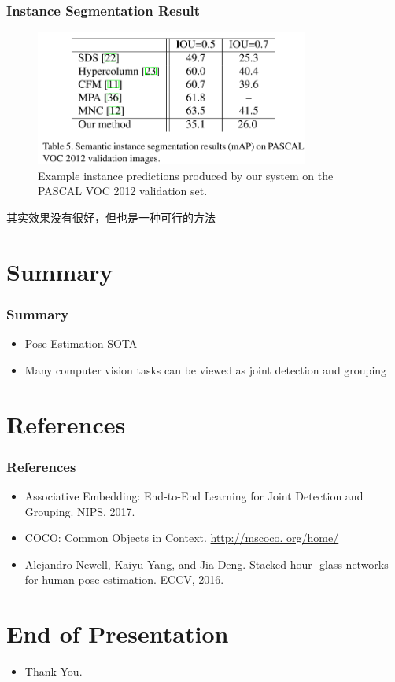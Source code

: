 \documentclass{ctexbeamer}
\begin{document}
  \begin{frame}
    \frametitle{Instance Segmentation Result}
    \begin{figure}
      \includegraphics[width=9cm]{fig/table5.png}
      \caption{\label{fig:seg_result}Example instance predictions produced by our system on the PASCAL VOC 2012 validation set.}
      \end{figure}
     \begin{block}{其实效果没有很好，但也是一种可行的方法}
     \end{block}
    \vskip 1cm
  \end{frame}
  \section{Summary}
  \begin{frame}
  \frametitle{Summary}
  \begin{itemize}
  \item Pose Estimation SOTA
  \item Many computer vision tasks can be viewed as joint detection and grouping
  \end{itemize}
  
  \vskip 1cm
  \end{frame}
  
  \section{References}
  \begin{frame}
  \frametitle{References}
  \begin{itemize}
  \item Associative Embedding: End-to-End Learning for Joint Detection and Grouping. NIPS, 2017.
  \item COCO: Common Objects in Context. \url{http://mscoco. org/home/} \\
  \item Alejandro Newell, Kaiyu Yang, and Jia Deng. Stacked hour- glass networks for human pose estimation. ECCV, 2016. \\
  \end{itemize}
  
  \vskip 1cm
  \end{frame}
  
  \section{End of Presentation}
  \begin{frame}
  \begin{itemize}[<+-| alert@+>]
  \item Thank You.
  \end{itemize}
  \end{frame}
  
  
\end{document}
